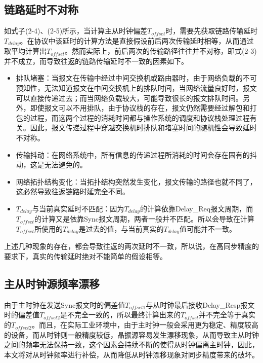 \subsection{链路延时不对称}
\label{sec:1588_problem_1}
如式子(2-4)、(2-5)所示，当计算主从时钟偏差$T_{offset}$时，需要先获取链路传输延时$T_{delay}$。在协议中该延时的计算方法是直接假设前后两次传输延时相等，从而通过取平均计算出$T_{offset}$。然而实际上，前后两次的传输路径往往并不对称，即式(2-3)并不成立，而导致往返的链路传输延时不一致的因素\supercite{55}如下。
\begin{itemize}[noitemsep,topsep=0pt,parsep=0pt,partopsep=0pt]
	\item 排队堵塞：当报文在传输中经过中间交换机或路由器时，由于网络负载的不可预知性，无法知道报文在中间交换机上的排队时间，当网络流量良好时，报文可以直接传递过去；而当网络负载较大，可能导致很长的报文排队时间。另外，即使报文可以不用排队，由于协议栈的存在，报文仍然需要经过解包和打包的过程，而这两个过程的消耗时间都与操作系统的调度和协议栈处理过程有关。因此，报文传递过程中穿越交换机时排队和堵塞时间的随机性会导致延时不对称\supercite{46}。
	\item 传输抖动：在网络系统中，所有信息的传递过程所消耗的时间会存在固有的抖动，这是无法避免的。
	\item 网络拓扑结构变化：当拓扑结构突然发生变化，报文传输的路径也就不同了，这必然导致往返链路时延完全不同。
	\item $T_{delay}$与当前真实延时不匹配：因为$T_{delay}$的计算依靠Delay\_Req报文周期，而$T_{offset}$的计算又是依靠Sync报文周期，两者一般并不匹配。所以会导致在计算$T_{offset}$所使用的$T_{delay}$是过去的值，与当前真实的$T_{delay}$值可能并不一致。
\end{itemize}

上述几种现象的存在，都会导致往返的两次延时不一致，所以说，在高同步精度的要求下，真实的传输延时绝对不能简单的假设相等。

\subsection{主从时钟源频率漂移}
由于主时钟在发送Sync报文时的偏差值$T_{offset1}$与从时钟最后接收Delay\_Resp报文时的偏差值$T_{offset2}$是不完全一致的，所以最终计算出来的$T_{offset}$并不完全等于真实的$T_{offset2}$。而且，在实际工业环境中，由于主时钟一般会采用更为稳定、精度较高的设备，而从时钟则一般精度较低，晶振源容易发生漂移现象，从而导致主从时钟之间的频率无法保持一致，这个因素会持续不断的使得从时钟偏离主时钟，因此，本文将对从时钟频率进行补偿，从而降低从时钟漂移现象对同步精度带来的破坏。

